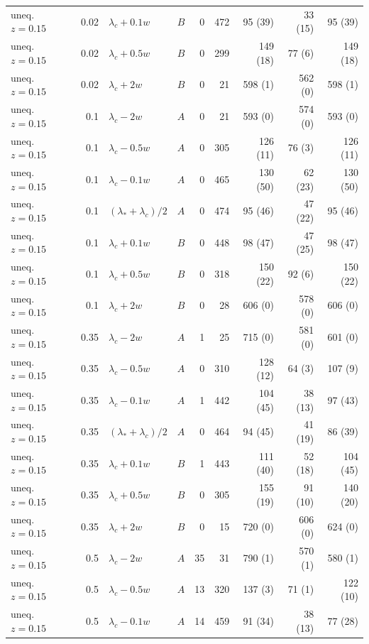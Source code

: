 \begin{longtable}{@{}lrllrrrrr@{}}
uneq. $z{=}0.15$ & 0.02 & $\lambda_c+0.1w$ & $B$ & 0 & 472 & 95 (39) & 33 (15) & 95 (39)\\
uneq. $z{=}0.15$ & 0.02 & $\lambda_c+0.5w$ & $B$ & 0 & 299 & 149 (18) & 77 (6) & 149 (18)\\
uneq. $z{=}0.15$ & 0.02 & $\lambda_c+2w$ & $B$ & 0 & 21 & 598 (1) & 562 (0) & 598 (1)\\
uneq. $z{=}0.15$ & 0.1 & $\lambda_c-2w$ & $A$ & 0 & 21 & 593 (0) & 574 (0) & 593 (0)\\
uneq. $z{=}0.15$ & 0.1 & $\lambda_c-0.5w$ & $A$ & 0 & 305 & 126 (11) & 76 (3) & 126 (11)\\
uneq. $z{=}0.15$ & 0.1 & $\lambda_c-0.1w$ & $A$ & 0 & 465 & 130 (50) & 62 (23) & 130 (50)\\
uneq. $z{=}0.15$ & 0.1 & $(\lambda_*+\lambda_c)/2$ & $A$ & 0 & 474 & 95 (46) & 47 (22) & 95 (46)\\
uneq. $z{=}0.15$ & 0.1 & $\lambda_c+0.1w$ & $B$ & 0 & 448 & 98 (47) & 47 (25) & 98 (47)\\
uneq. $z{=}0.15$ & 0.1 & $\lambda_c+0.5w$ & $B$ & 0 & 318 & 150 (22) & 92 (6) & 150 (22)\\
uneq. $z{=}0.15$ & 0.1 & $\lambda_c+2w$ & $B$ & 0 & 28 & 606 (0) & 578 (0) & 606 (0)\\
uneq. $z{=}0.15$ & 0.35 & $\lambda_c-2w$ & $A$ & 1 & 25 & 715 (0) & 581 (0) & 601 (0)\\
uneq. $z{=}0.15$ & 0.35 & $\lambda_c-0.5w$ & $A$ & 0 & 310 & 128 (12) & 64 (3) & 107 (9)\\
uneq. $z{=}0.15$ & 0.35 & $\lambda_c-0.1w$ & $A$ & 1 & 442 & 104 (45) & 38 (13) & 97 (43)\\
uneq. $z{=}0.15$ & 0.35 & $(\lambda_*+\lambda_c)/2$ & $A$ & 0 & 464 & 94 (45) & 41 (19) & 86 (39)\\
uneq. $z{=}0.15$ & 0.35 & $\lambda_c+0.1w$ & $B$ & 1 & 443 & 111 (40) & 52 (18) & 104 (45)\\
uneq. $z{=}0.15$ & 0.35 & $\lambda_c+0.5w$ & $B$ & 0 & 305 & 155 (19) & 91 (10) & 140 (20)\\
uneq. $z{=}0.15$ & 0.35 & $\lambda_c+2w$ & $B$ & 0 & 15 & 720 (0) & 606 (0) & 624 (0)\\
uneq. $z{=}0.15$ & 0.5 & $\lambda_c-2w$ & $A$ & 35 & 31 & 790 (1) & 570 (1) & 580 (1)\\
uneq. $z{=}0.15$ & 0.5 & $\lambda_c-0.5w$ & $A$ & 13 & 320 & 137 (3) & 71 (1) & 122 (10)\\
uneq. $z{=}0.15$ & 0.5 & $\lambda_c-0.1w$ & $A$ & 14 & 459 & 91 (34) & 38 (13) & 77 (28)\\

\end{longtable}
